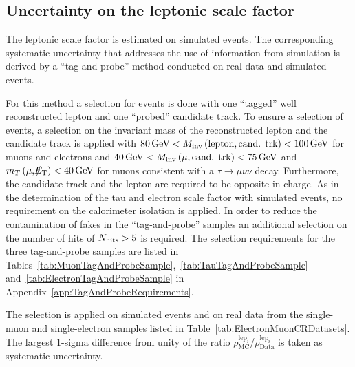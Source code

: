 \subsection{Uncertainty on the leptonic scale factor}
\label{sec:LeptonScaleUncertainty}

The leptonic scale factor \leptonscalefactor is estimated on simulated \WJets events.
The corresponding systematic uncertainty that addresses the use of information from simulation is derived by a ``tag-and-probe'' method conducted on real data and simulated events.

For this method a selection for \Zlep events is done with one ``tagged'' well reconstructed lepton and one ``probed'' candidate track.
To ensure a selection of \Zlep events, a selection on the invariant mass of  the reconstructed lepton and the candidate track is applied with $80\,\text{Ge}\kern-0.06667em\text{V}<M_{\text{inv}}\left( \text{lepton}, \text{cand. trk}  \right)<100\,\text{Ge}\kern-0.06667em\text{V}$ for muons and electrons and $40\,\text{Ge}\kern-0.06667em\text{V}<M_{\text{inv}}\left( \mu, \text{cand. trk}  \right)<75\,\text{Ge}\kern-0.06667em\text{V}$ and $m_T\left(\mu,\slash\mkern-12mu{E}_{\text{T}}\right)<40\,\text{Ge}\kern-0.06667em\text{V}$ for muons consistent with a $\tau\rightarrow\mu\nu\nu$ decay.
Furthermore, the candidate track and the lepton are required to be opposite in charge.
As in the determination of the tau and electron scale factor with simulated \WJets events, no requirement on the calorimeter isolation is applied.
In order to reduce the contamination of fakes in the ``tag-and-probe'' samples an additional selection on the number of hits of $N_{\text{hits}}>5$ is required.
The selection requirements for the three tag-and-probe samples are listed in Tables~\ref{tab:MuonTagAndProbeSample},~\ref{tab:TauTagAndProbeSample} and~\ref{tab:ElectronTagAndProbeSample} in Appendix~\ref{app:TagAndProbeRequirements}.


The selection is applied on simulated \Zlep events and on real data from the single-muon and single-electron samples listed in Table~\ref{tab:ElectronMuonCRDatasets}.
The largest 1-sigma difference from unity of the ratio $\rho^{\text{lep}_i}_{\text{MC}}$/$\rho^{\text{lep}_i}_{\text{Data}}$ is taken as systematic uncertainty.

